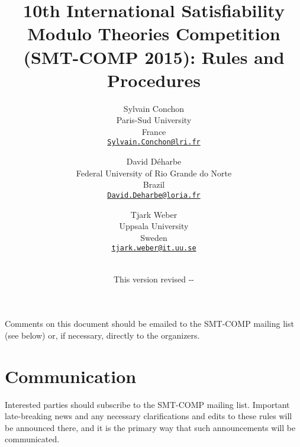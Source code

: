 \documentclass[12pt]{article}
\begin{document}
\date{\small This version revised \the\year-\the\month-\the\day}

\title{10th International Satisfiability Modulo Theories Competition
  (SMT-COMP 2015): Rules and Procedures}

\def\doauthor#1{{%
  \hsize.5\hsize \advance\hsize by-1cm %
  \def\\{\hss\egroup\hbox to\hsize\bgroup\strut\hss}%
  \vbox{\hbox to\hsize\bgroup\strut\hss#1\hss\egroup}}}%

\def\header#1{\medskip\noindent\textbf{#1}}

\author{%
Sylvain Conchon \\
Paris-Sud University \\
France \\
{\small\href{mailto:Sylvain.Conchon@lri.fr}{\tt Sylvain.Conchon@lri.fr}} \\
\and
David D{\'e}harbe \\
Federal University of Rio Grande do Norte \\
Brazil \\
{\small\href{mailto:David.Deharbe@loria.fr}{\tt David.Deharbe@loria.fr}} \\
\and
Tjark Weber \\
Uppsala University \\
Sweden \\
{\small\href{mailto:tjark.weber@it.uu.se}{\tt tjark.weber@it.uu.se}} \\
\\
}

\maketitle

\noindent Comments on this document should be emailed to the SMT-COMP
mailing list (see below) or, if necessary, directly to the organizers.


\section{Communication}
\label{sec:communication}

Interested parties should subscribe to the SMT-COMP mailing list.
Important late-breaking news and any necessary clarifications and
edits to these rules will be announced there, and it is the primary
way that such announcements will be communicated.
\end{document}
